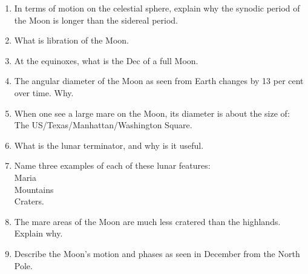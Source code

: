 \documentclass[11pt]{article}
\begin{document}
\begin{enumerate}
\item
In terms of motion on the celestial sphere, explain why the synodic
period of the Moon is longer than the sidereal period.


\item
What is libration of the Moon.

\item
At the equinoxes, what is the Dec of a full Moon.



\item
The angular diameter of the Moon as seen from Earth changes by 13 per cent
over time. Why.

\item
When one see a large mare on the Moon, its diameter is about the size
of: \\ The US/Texas/Manhattan/Washington Square.


\item 
What is the lunar terminator, and why is it useful.

\item
Name three examples of each of these lunar features: \\
Maria \\
Mountains \\
Craters.

\item
The mare areas of the Moon are much less cratered than the
highlands. Explain why.


\item
Describe the Moon's motion and phases as seen in December from
the North Pole.
\end{enumerate} 
\end{document}

